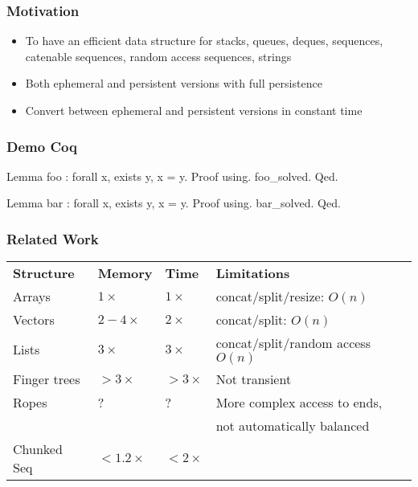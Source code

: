 \begin{frame}[fragile]
\frametitle{Motivation}

\begin{itemize}
	\setlength\itemsep{1.5em}
	\item To have an efficient data structure for stacks, queues, deques, sequences, catenable sequences, random access sequences, strings\\
	\item Both ephemeral and persistent versions with full persistence\\
	\item Convert between ephemeral and persistent versions in constant time
\end{itemize}

\end{frame}


\begin{frame}[fragile]
\frametitle{Demo Coq}

\begin{coq}
  Lemma foo : forall x, exists y, x = y.
  Proof using.
    foo_solved.
  Qed.
\end{coq}

\begin{coqs}
  Lemma bar : forall x, exists y, x = y.
  Proof using.
    bar_solved.
  Qed.
\end{coqs}

\end{frame}


\begin{frame}[fragile]
\frametitle{Related Work}

\begin{tabular}{llll}
 \textbf{Structure} & \textbf{Memory} & \textbf{Time} & \textbf{Limitations}\\
Arrays & $1\times$ & $1\times$ & concat/split/resize: $O(n)$ \\
Vectors & $2-4\times$ & $2\times$ & concat/split: $O(n)$\\
Lists & $3\times$ & $3\times$ & concat/split/random access $O(n)$\\
Finger trees & $>3\times$ & $>3\times$ & Not transient\\
Ropes & ? & ? & More complex access to ends, \\
& & & not automatically balanced\\
Chunked Seq & $<1.2 \times$ & $<2 \times$ &
\end{tabular}

\end{frame}

